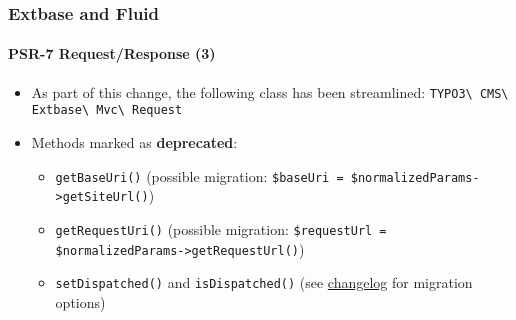 %

\begin{frame}[fragile]
	\frametitle{Extbase and Fluid}
	\framesubtitle{PSR-7 Request/Response (3)}


	\begin{itemize}
		\item As part of this change, the following class has been streamlined:\newline
			\texttt{TYPO3\textbackslash
				CMS\textbackslash
				Extbase\textbackslash
				Mvc\textbackslash
				Request}
		\item Methods marked as \textbf{deprecated}:
			\begin{itemize}
				\item \texttt{getBaseUri()}\newline
					\smaller(possible migration: \texttt{\$baseUri = \$normalizedParams->getSiteUrl()})\small
				\item \texttt{getRequestUri()}\newline
					\smaller(possible migration: \texttt{\$requestUrl = \$normalizedParams->getRequestUrl()})\small
				\item \texttt{setDispatched()} and \texttt{isDispatched()}\newline
					\smaller(see \href{https://docs.typo3.org/c/typo3/cms-core/master/en-us/Changelog/11.3/Deprecation-94394-ExtbaseRequestSetDispatchedAndIsDispatched.html}{changelog} for migration options)\small
			\end{itemize}

	\end{itemize}

\end{frame}

